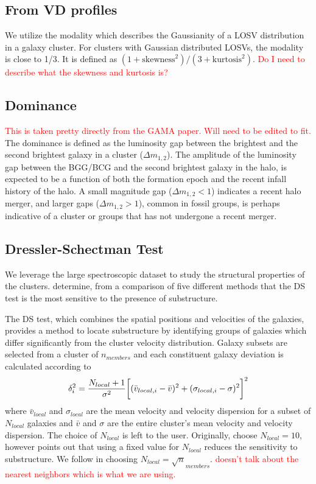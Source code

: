 \documentclass[apj, revtex4]{emulateapj}
\newcommand{\editorial}[1]{\textcolor{red}{#1}}
\begin{document}
\subsection{From VD profiles}
We utilize the modality \citep{Oliva-Altamirano2014} which describes the Gaussianity of a LOSV distribution in a galaxy cluster. For clusters with Gaussian distributed LOSVs, the modality is close to 1/3. It is defined as $(1+\mathrm{skewness}^2)/(3+\mathrm{kurtosis}^2)$. \editorial{Do I need to describe what the skewness and kurtosis is?}

\subsection{Dominance}
\editorial{This is taken pretty directly from the GAMA paper. Will need to be edited to fit.}
The dominance is defined as the luminosity gap between the brightest and the second brightest galaxy in a cluster ($\Delta m_{1, 2}$). The amplitude of the luminosity gap between the BGG/BCG and the second brightest galaxy in the halo, is expected to be a function of both the formation epoch and the recent infall history of the halo. A small magnitude gap ($\Delta m_{1, 2} < 1$) indicates a recent halo merger, and larger gaps ($\Delta m_{1, 2} > 1$), common in fossil groups, is perhaps indicative of a cluster or groups that has not undergone a recent merger.

\subsection{Dressler-Schectman Test}
We leverage the large spectroscopic dataset to study the structural properties of the clusters. \cite{Pinkney1996} determine, from a comparison of five different methods that the DS test is the most sensitive to the presence of substructure.

The DS test, which combines the spatial positions and velocities of the galaxies, provides a method to locate substructure by identifying groups of galaxies which differ significantly from the cluster velocity distribution. Galaxy subsets are selected from a cluster of $n_{members}$ and each constituent galaxy deviation is calculated according to
\begin{equation}
	\delta_i^2 = \frac{N_{local}+1}{\sigma^2}\bigg{[}(\bar{v}_{local,i} - \bar{v})^2 + (\sigma_{local,i} - \sigma)^2\bigg{]}^2
\end{equation}
where $\bar{v}_{local}$ and $\sigma_{local}$ are the mean velocity and velocity dispersion for a subset of $N_{local}$ galaxies and $\bar{v}$ and $\sigma$ are the entire cluster's mean velocity and velocity dispersion. The choice of $N_{local}$ is left to the user. Originally, \cite{Dressler1988} choose $N_{local}=10$, however \cite{Bird1994} points out that using a fixed value for $N_{local}$ reduces the sensitivity to substructure. We follow \cite{Bird1994} in choosing $N_{local} = \sqrt n_{members}$. \editorial{doesn't talk about the nearest neighbors which is what we are using.}
\end{document}
